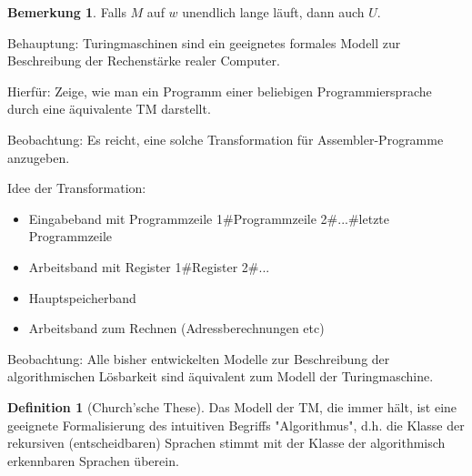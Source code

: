 \documentclass[11pt]{article} %
\theoremstyle{definition}
\newtheorem{definition}{Definition}
\newtheorem*{bemerkung}{Bemerkung}
\begin{document}
\begin{bemerkung}
Falls $M$ auf $w$ unendlich lange läuft, dann auch $U$.
\end{bemerkung}

Behauptung: Turingmaschinen sind ein geeignetes formales Modell zur Beschreibung der Rechenstärke realer Computer.

Hierfür: Zeige, wie man ein Programm einer beliebigen Programmiersprache durch eine äquivalente TM darstellt.

Beobachtung: Es reicht, eine solche Transformation für Assembler-Programme anzugeben.

Idee der Transformation:

\begin{itemize}
\item Eingabeband mit Programmzeile 1\#Programmzeile 2\#...\#letzte Programmzeile

\item Arbeitsband mit Register 1\#Register 2\#...

\item Hauptspeicherband

\item Arbeitsband zum Rechnen (Adressberechnungen etc)
\end{itemize}

Beobachtung: Alle bisher entwickelten Modelle zur Beschreibung der algorithmischen Lösbarkeit sind äquivalent zum Modell der Turingmaschine.

\begin{definition}[Church'sche These]
Das Modell der TM, die immer hält, ist eine geeignete Formalisierung des intuitiven Begriffs "Algorithmus", d.h. die Klasse der rekursiven (entscheidbaren) Sprachen stimmt mit der Klasse der algorithmisch erkennbaren Sprachen überein.
\end{definition}
\end{document}
